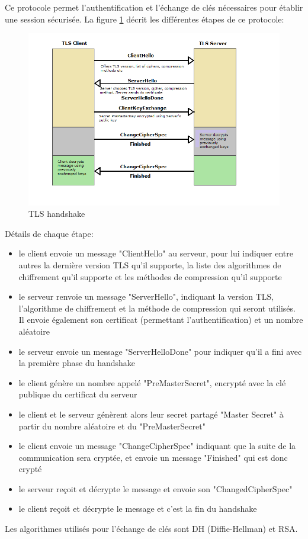 Ce protocole permet l'authentification et l'échange de clés nécessaires pour établir une session sécurisée. La figure \ref{handshake} décrit les différentes étapes de ce protocole:
\begin{figure}[H]
  \centering
  \includegraphics[scale=0.6]{img/tls-handshake.png}
  \caption{TLS handshake}
  \label{handshake}
\end{figure}  

Détails de chaque étape:
\begin{itemize}
\item le client envoie un message "ClientHello" au serveur, pour lui indiquer entre autres la dernière version TLS qu'il supporte, la liste des algorithmes de chiffrement qu'il supporte et les méthodes de compression qu'il supporte
\item le serveur renvoie un message "ServerHello", indiquant la version TLS, l'algorithme de chiffrement et la méthode de compression qui seront utilisés. Il envoie également son certificat (permettant l'authentification) et un nombre aléatoire
\item le serveur envoie un message "ServerHelloDone" pour indiquer qu'il a fini avec la première phase du handshake
\item le client génère un nombre appelé "PreMasterSecret", encrypté avec la clé publique du certificat du serveur
\item le client et le serveur génèrent alors leur secret partagé "Master Secret" à partir du nombre aléatoire et du "PreMasterSecret"
\item le client envoie un message "ChangeCipherSpec" indiquant que la suite de la communication sera cryptée, et envoie un message "Finished" qui est donc crypté
\item le serveur reçoit et décrypte le message et envoie son "ChangedCipherSpec"
\item le client reçoit et décrypte le message et c'est la fin du handshake
\end{itemize}
Les algorithmes utilisés pour l'échange de clés sont DH (Diffie-Hellman) et RSA.

